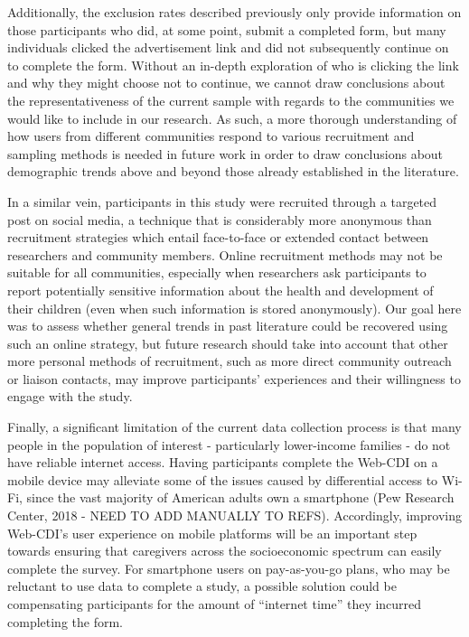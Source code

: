 \documentclass[
  english,
  ,man,floatsintext]{apa6}
\begin{document}
Additionally, the exclusion rates described previously only provide information on those participants who did, at some point, submit a completed form, but many individuals clicked the advertisement link and did not subsequently continue on to complete the form. Without an in-depth exploration of who is clicking the link and why they might choose not to continue, we cannot draw conclusions about the representativeness of the current sample with regards to the communities we would like to include in our research. As such, a more thorough understanding of how users from different communities respond to various recruitment and sampling methods is needed in future work in order to draw conclusions about demographic trends above and beyond those already established in the literature.

In a similar vein, participants in this study were recruited through a targeted post on social media, a technique that is considerably more anonymous than recruitment strategies which entail face-to-face or extended contact between researchers and community members. Online recruitment methods may not be suitable for all communities, especially when researchers ask participants to report potentially sensitive information about the health and development of their children (even when such information is stored anonymously). Our goal here was to assess whether general trends in past literature could be recovered using such an online strategy, but future research should take into account that other more personal methods of recruitment, such as more direct community outreach or liaison contacts, may improve participants' experiences and their willingness to engage with the study.

Finally, a significant limitation of the current data collection process is that many people in the population of interest - particularly lower-income families - do not have reliable internet access. Having participants complete the Web-CDI on a mobile device may alleviate some of the issues caused by differential access to Wi-Fi, since the vast majority of American adults own a smartphone (Pew Research Center, 2018 - NEED TO ADD MANUALLY TO REFS). Accordingly, improving Web-CDI's user experience on mobile platforms will be an important step towards ensuring that caregivers across the socioeconomic spectrum can easily complete the survey. For smartphone users on pay-as-you-go plans, who may be reluctant to use data to complete a study, a possible solution could be compensating participants for the amount of \enquote{internet time} they incurred completing the form.
\end{document}

